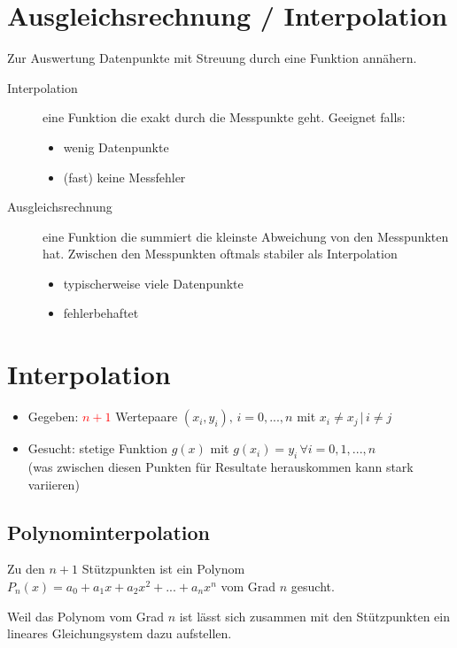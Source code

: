 \section{Ausgleichsrechnung / Interpolation}

Zur Auswertung Datenpunkte mit Streuung durch eine Funktion annähern.

\begin{description}
	\item[Interpolation] eine Funktion die exakt durch die Messpunkte geht.
		Geeignet falls:
		\begin{itemize}
			\item wenig Datenpunkte
			\item (fast) keine Messfehler
		\end{itemize}
	\item[Ausgleichsrechnung] eine Funktion die summiert die kleinste Abweichung
		von den Messpunkten hat. Zwischen den Messpunkten oftmals stabiler
		als Interpolation
		\begin{itemize}
			\item typischerweise viele Datenpunkte
			\item fehlerbehaftet
		\end{itemize}
\end{description}

\section{Interpolation}

\begin{itemize}
	\item Gegeben: \textcolor{red}{$n+1$} Wertepaare $(x_i, y_i), \, i = 0,...,n$
	      mit $x_i \ne x_j \, | \, i \ne j$
	\item Gesucht: stetige Funktion $g(x)$ mit $g(x_i) = y_i \, \forall i = 0,1,...,n$ \\
	      (was zwischen diesen Punkten für Resultate herauskommen kann stark variieren)
\end{itemize}


\subsection{Polynominterpolation}

Zu den $n+1$ Stützpunkten ist ein Polynom $P_n(x)
	= a_0 + a_1 x + a_2 x^2 + ... + a_n x^n$ vom Grad $n$ gesucht.

Weil das Polynom vom Grad $n$ ist lässt sich zusammen mit den Stützpunkten
ein lineares Gleichungsystem dazu aufstellen.

